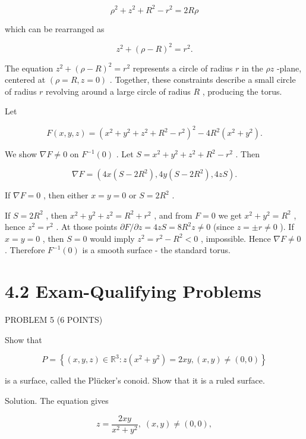 \documentclass[10pt]{article}
\begin{document}
\[
{\rho }^{2} + {z}^{2} + {R}^{2} - {r}^{2} = {2R\rho }
\]

which can be rearranged as

\[
{z}^{2} + {\left( \rho  - R\right) }^{2} = {r}^{2}.
\]

The equation \({z}^{2} + {\left( \rho  - R\right) }^{2} = {r}^{2}\) represents a circle of radius \(r\) in the \({\rho z}\) -plane, centered at \(\left( {\rho  = R,z = 0}\right)\) . Together, these constraints describe a small circle of radius \(r\) revolving around a large circle of radius \(R\) , producing the torus.

Let

\[
F\left( {x,y,z}\right)  = {\left( {x}^{2} + {y}^{2} + {z}^{2} + {R}^{2} - {r}^{2}\right) }^{2} - 4{R}^{2}\left( {{x}^{2} + {y}^{2}}\right) .
\]

We show \(\nabla F \neq  0\) on \({F}^{-1}\left( 0\right)\) . Let \(S = {x}^{2} + {y}^{2} + {z}^{2} + {R}^{2} - {r}^{2}\) . Then

\[
\nabla F = \left( {{4x}\left( {S - 2{R}^{2}}\right) ,{4y}\left( {S - 2{R}^{2}}\right) ,{4zS}}\right) .
\]

If \(\nabla F = 0\) , then either \(x = y = 0\) or \(S = 2{R}^{2}\) .

If \(S = 2{R}^{2}\) , then \({x}^{2} + {y}^{2} + {z}^{2} = {R}^{2} + {r}^{2}\) , and from \(F = 0\) we get \({x}^{2} + {y}^{2} = {R}^{2}\) , hence \({z}^{2} = {r}^{2}\) . At those points \(\partial F/\partial z = {4zS} = 8{R}^{2}z \neq  0\) (since \(z =  \pm  r \neq  0\) ). If \(x = y = 0\) , then \(S = 0\) would imply \({z}^{2} = {r}^{2} - {R}^{2} < 0\) , impossible. Hence \(\nabla F \neq  0\) . Therefore \({F}^{-1}\left( 0\right)\) is a smooth surface - the standard torus.

\section*{4.2 Exam-Qualifying Problems}

PROBLEM 5 (6 POINTS)

Show that

\[
P = \left\{  {\left( {x,y,z}\right)  \in  {\mathbb{R}}^{3} : z\left( {{x}^{2} + {y}^{2}}\right)  = {2xy},\left( {x,y}\right)  \neq  \left( {0,0}\right) }\right\}
\]

is a surface, called the Plücker's conoid. Show that it is a ruled surface.

Solution. The equation gives

\[
z = \frac{2xy}{{x}^{2} + {y}^{2}},\;\left( {x,y}\right)  \neq  \left( {0,0}\right) ,
\]
\end{document}
